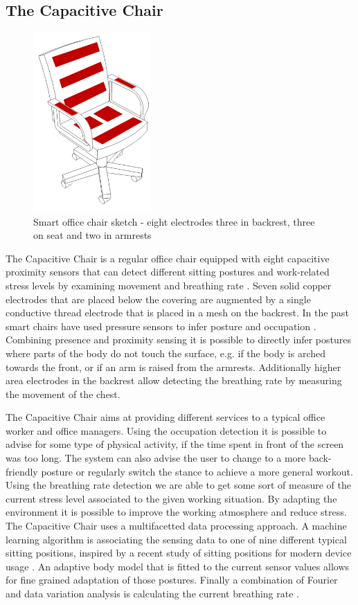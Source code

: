 \subsection{The Capacitive Chair}
\begin{figure}[h]
\centering
\includegraphics[width=0.4\textwidth]{images/smartofficechair}
\caption{Smart office chair sketch - eight electrodes three in backrest, three on seat and two in armrests}
\label{fig:smartchair_sketch}
\end{figure}
The Capacitive Chair is a regular office chair equipped with eight capacitive proximity sensors that can detect different sitting postures and work-related stress levels by examining movement and breathing rate \cite{Braun2013ChairAid}. Seven solid copper electrodes that are placed below the covering are augmented by a single conductive thread electrode that is placed in a mesh on the backrest. In the past smart chairs have used pressure sensors to infer posture and occupation \cite{tan2001sensing}. Combining presence and proximity sensing it is possible to directly infer postures where parts of the body do not touch the surface, e.g. if the body is arched towards the front, or if an arm is raised from the armrests. Additionally higher area electrodes in the backrest allow detecting the breathing rate by measuring the movement of the chest.

The Capacitive Chair aims at providing different services to a typical office worker and office managers. Using the occupation detection it is possible to advise for some type of physical activity, if the time spent in front of the screen was too long. The system can also advise the user to change to a more back-friendly posture or regularly switch the stance to achieve a more general workout. Using the breathing rate detection we are able to get some sort of measure of the current stress level associated to the given working situation. By adapting the environment it is possible to improve the working atmosphere and reduce stress. The Capacitive Chair uses a multifacetted data processing approach. A machine learning algorithm is associating the sensing data to one of nine different typical sitting positions, inspired by a recent study of sitting positions for modern device usage \cite{globalPosture}. An adaptive body model that is fitted to the current sensor values allows for fine grained adaptation of those postures. Finally a combination of Fourier and data variation analysis is calculating the current breathing rate \cite{Braun2013ChairAid}.

